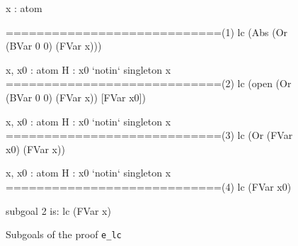 \documentclass[a4paper, 11pt, fleqn]{scrreprt}
\newcommand{\coqinline}[1]{\texttt{#1}}
\begin{document}
	\begin{figure}[H]
	\begin{flushleft}
	\begin{minipage}[t]{.4 \linewidth}
		\begin{coqcode}
x : atom

============================(1)
lc (Abs (Or (BVar 0 0) (FVar x)))


x, x0 : atom
H : x0 `notin` singleton x
============================(2)
lc (open (Or (BVar 0 0) (FVar x))
[FVar x0])
		\end{coqcode}
	\end{minipage}
	\hfill
	\vrule
	\vspace{.5 em}
	\begin{minipage}[t]{.55 \linewidth}
		\begin{coqcode}
  x, x0 : atom
  H : x0 `notin` singleton x
  ============================(3)
  lc (Or (FVar x0) (FVar x))


  x, x0 : atom
  H : x0 `notin` singleton x
  ============================(4)
  lc (FVar x0)

  subgoal 2 is:
  lc (FVar x)
		\end{coqcode}
	\end{minipage}
\end{flushleft}
	\caption{Subgoals of the proof \coqinline{e_lc}}
	\label{lcproof}
	\end{figure}
\end{document}

